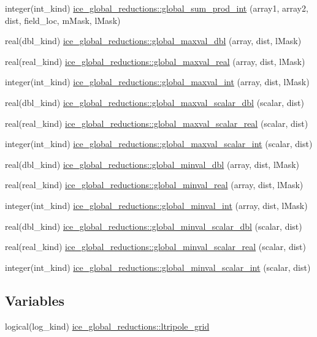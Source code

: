 \begin{DoxyCompactItemize}
integer(int\_\-kind) \hyperlink{namespaceice__global__reductions_a4aff2c1b8fa4c266a0f08cef29bba2ab}{ice\_\-global\_\-reductions::global\_\-sum\_\-prod\_\-int} (array1, array2, dist, field\_\-loc, mMask, lMask)
\item 
real(dbl\_\-kind) \hyperlink{namespaceice__global__reductions_afcc42be44d8b5383d354d22c849ca69f}{ice\_\-global\_\-reductions::global\_\-maxval\_\-dbl} (array, dist, lMask)
\item 
real(real\_\-kind) \hyperlink{namespaceice__global__reductions_a85255323eef62fc17da07a4a61d89744}{ice\_\-global\_\-reductions::global\_\-maxval\_\-real} (array, dist, lMask)
\item 
integer(int\_\-kind) \hyperlink{namespaceice__global__reductions_a09f454330678940b2277d70e4535290e}{ice\_\-global\_\-reductions::global\_\-maxval\_\-int} (array, dist, lMask)
\item 
real(dbl\_\-kind) \hyperlink{namespaceice__global__reductions_a08a9bbce6bc2a8c8961009e0923ac274}{ice\_\-global\_\-reductions::global\_\-maxval\_\-scalar\_\-dbl} (scalar, dist)
\item 
real(real\_\-kind) \hyperlink{namespaceice__global__reductions_a1f4cce7e3e8f22f0366ff60313a3e697}{ice\_\-global\_\-reductions::global\_\-maxval\_\-scalar\_\-real} (scalar, dist)
\item 
integer(int\_\-kind) \hyperlink{namespaceice__global__reductions_aa1013da08de374f45ff86d6d2be77581}{ice\_\-global\_\-reductions::global\_\-maxval\_\-scalar\_\-int} (scalar, dist)
\item 
real(dbl\_\-kind) \hyperlink{namespaceice__global__reductions_a7c09e90ceb0de6d5f40a525cabbc193a}{ice\_\-global\_\-reductions::global\_\-minval\_\-dbl} (array, dist, lMask)
\item 
real(real\_\-kind) \hyperlink{namespaceice__global__reductions_a98165af03a1ac68b1a6114c63d9b7b11}{ice\_\-global\_\-reductions::global\_\-minval\_\-real} (array, dist, lMask)
\item 
integer(int\_\-kind) \hyperlink{namespaceice__global__reductions_a6158397f98e574f0c587459b40db8d18}{ice\_\-global\_\-reductions::global\_\-minval\_\-int} (array, dist, lMask)
\item 
real(dbl\_\-kind) \hyperlink{namespaceice__global__reductions_adf0dafd3b9b49b80c493ccf9f7fd7072}{ice\_\-global\_\-reductions::global\_\-minval\_\-scalar\_\-dbl} (scalar, dist)
\item 
real(real\_\-kind) \hyperlink{namespaceice__global__reductions_a9bd28e27173eaf4c5a60841318b3d9f1}{ice\_\-global\_\-reductions::global\_\-minval\_\-scalar\_\-real} (scalar, dist)
\item 
integer(int\_\-kind) \hyperlink{namespaceice__global__reductions_ab4a2ba94077b4e88fd24c9c1950026e3}{ice\_\-global\_\-reductions::global\_\-minval\_\-scalar\_\-int} (scalar, dist)
\end{DoxyCompactItemize}
\subsection*{Variables}
\begin{DoxyCompactItemize}
\item 
logical(log\_\-kind) \hyperlink{namespaceice__global__reductions_a14140465b78c72f3b6923a37f4b8ea4c}{ice\_\-global\_\-reductions::ltripole\_\-grid}
\end{DoxyCompactItemize}
